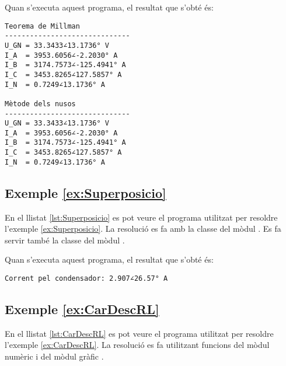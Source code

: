 Quan s'executa aquest programa, el resultat que s'obté és:
\lstset{
	language=,
	numbers=none,
	frame=none
}
\begin{lstlisting}
Teorema de Millman
------------------------------
U_GN = 33.3433∠13.1736° V
I_A  = 3953.6056∠-2.2030° A
I_B  = 3174.7573∠-125.4941° A
I_C  = 3453.8265∠127.5857° A
I_N  = 0.7249∠13.1736° A

Mètode dels nusos
------------------------------
U_GN = 33.3433∠13.1736° V
I_A  = 3953.6056∠-2.2030° A
I_B  = 3174.7573∠-125.4941° A
I_C  = 3453.8265∠127.5857° A
I_N  = 0.7249∠13.1736° A
\end{lstlisting} 


\hypertarget{exemple:Superposicio}{\subsection{Exemple \ref*{ex:Superposicio} \Superposicio}}

En el llistat \vref{lst:Superposicio} es pot veure el programa utilitzat per resoldre l'exemple \vref{ex:Superposicio}. La resolució es fa amb la classe  del mòdul . Es fa servir també la classe  del mòdul .


Quan s'executa aquest programa, el resultat que s'obté és:
\lstset{
	language=,
	numbers=none,
	frame=none
}
\begin{lstlisting}
Corrent pel condensador: 2.907∠26.57° A
\end{lstlisting} 


\hypertarget{exemple:CarDescRL}{\subsection{Exemple \ref*{ex:CarDescRL} \CarDescRL}}

En el llistat \vref{lst:CarDescRL} es pot veure el programa utilitzat per resoldre l'exemple \vref{ex:CarDescRL}. La resolució es fa utilitzant funcions del mòdul numèric  i del mòdul gràfic  .


